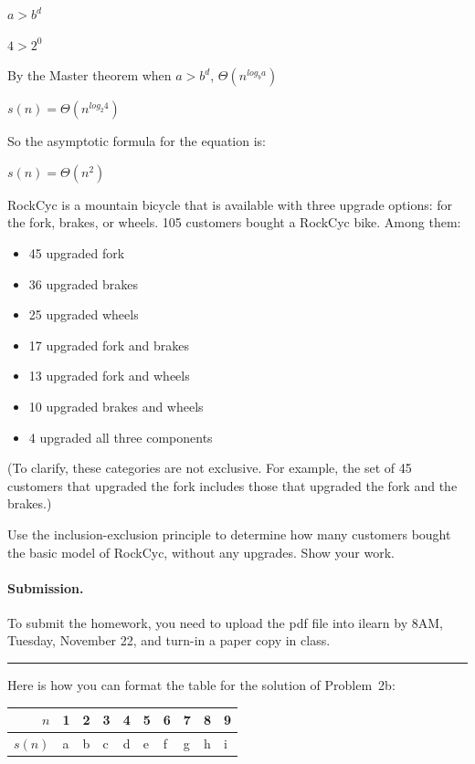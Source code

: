 \documentclass{article}
\newcommand{\hwduedate}{{8AM, Tuesday, November 22}}
\begin{document}
\begin{solution}
$a>b^d$
\newline

$4>2^0$
\newline

By the Master theorem when $a>b^d$, $\Theta(n^{log_b a})$
\newline

$s(n) = \Theta(n^{log_2 4})$
\newline

So the asymptotic formula for the equation is:
\newline

$s(n) = \Theta(n^2)$
\newline






\end{solution}

\begin{problem}
RockCyc is a mountain bicycle that is available with three upgrade options:
for the fork, brakes, or wheels. 105 customers bought a RockCyc bike. Among them:
%
\begin{itemize}
	\item 45 upgraded fork
	\item 36 upgraded brakes
	\item 25 upgraded wheels
	\item 17 upgraded fork and brakes
	\item 13 upgraded fork and wheels
	\item 10 upgraded brakes and wheels
	\item 4 upgraded all three components
\end{itemize}
%
(To clarify, these categories are not exclusive. For example, the set of 45 customers that upgraded
the fork includes those that upgraded the fork and the brakes.)

Use the inclusion-exclusion principle to determine how many customers bought the basic model
of RockCyc, without any upgrades.
Show your work.
\end{problem}



\vskip 0.15in
\paragraph{Submission.}
To submit the homework, you need to upload the pdf file into ilearn by {\hwduedate},
and turn-in a paper copy in class.

\bigskip
\noindent
\hrule

\bigskip

\noindent
Here is how you can format the table for the solution of Problem~2b:


\bigskip
\noindent
\begin{tabular}{|r|p{0.15in}|p{0.15in}|p{0.15in}|p{0.15in}|p{0.15in}|p{0.15in}|p{0.15in}|p{0.15in}|p{0.15in}|} \hline
$n$ 		& 1 & 2 & 3 & 4 & 5 & 6 & 7 & 8 & 9  
\\ \hline
$s(n)$		& a & b & c & d & e & f & g & h & i 
\\ \hline
\end{tabular}
\end{document}
